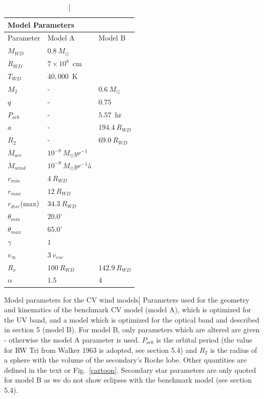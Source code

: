\begin{table}
\centering
\begin{tabular}{p{2cm}p{2cm}p{2cm}}
\multicolumn{2}{|l|}{Model Parameters}  \\
\hline Parameter 	&	 Model A  & Model B \\ 
\hline \hline 
$M_{WD}$ 	 &	 $0.8~M_{\odot}$  &     \\ 
$R_{WD}$ 	 &	 $7\times10^{8}$~cm  & \\ 
$T_{WD}$ 	 &	 $40,000$~K        &  \\
$M_{2}$ 	& -&	 $0.6~M_{\odot}$   \\ 
$q$ 	&- &	 $0.75$   \\ 
$P_{orb}$ 	&- &	 $5.57$~hr   \\ 
$a$ 	& -&	 $194.4~R_{WD}$   \\ 
$R_2$   &   -  &	 $69.0~R_{WD}$  \\ 
$\dot{M}_{acc}$ 	 &	 $10^{-8}~M_{\odot}yr^{-1}$  &\\ 
$\dot{M}_{wind}$  &	$10^{-9}~M_{\odot}yr^{-1}$å  & \\ 
$r_{min}$ 	&	 $4~R_{WD}$ &  \\ 
$r_{max}$ 	&	 $12~R_{WD}$  &  \\ 
$r_{disc}$(max) 	&	 $34.3~R_{WD}$  &  \\ 
$\theta_{min}$ 	&	 $20.0^{\circ}$  &  \\ 
$\theta_{max}$ 	&	 $65.0^{\circ}$  &  \\ 
$\gamma$ 	&	 $1$  &  \\ 
$v_{\infty}$ 	&	 $3~v_{esc}$  &  \\ 
$R_v$ 	        &	 $100~R_{WD}$  &  $142.9~R_{WD}$  \\ 
$\alpha$ 	&	 $1.5$   &   $4$\\
\end{tabular}
\centering
\caption
[Model parameters for the CV wind models]
{
Parameters used for the geometry and kinematics of the benchmark 
CV model (model A), which is optimized for the UV band, and a model
which is optimized for the optical band and described in section 5 (model B).
For model B, only parameters which are altered are given - otherwise the
model A parameter is used. $P_{orb}$ is the orbital period 
(the value for RW Tri from Walker 1963 is adopted, see section 5.4) and 
$R_2$ is the radius of a sphere with the volume of the secondary's Roche lobe. 
Other quantities are defined in the text or Fig.~\ref{cartoon}.
Secondary star parameters are only quoted for 
model B as we do not show eclipses with the 
benchmark model (see section 5.4).
}
\label{wind_param}
\label{modelb_table}
\end{table}

